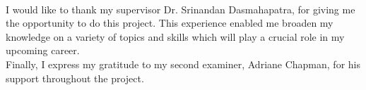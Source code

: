 

\begin{acknowledgements}
\\
I would like to thank my supervisor Dr. Srinandan Dasmahapatra, for giving me the opportunity to do this project. This experience enabled me broaden my knowledge on a variety of topics and skills which will play a crucial role in my upcoming career. \\

Finally, I express my gratitude to my second examiner, Adriane Chapman, for his support throughout the project. 

\end{acknowledgements}
